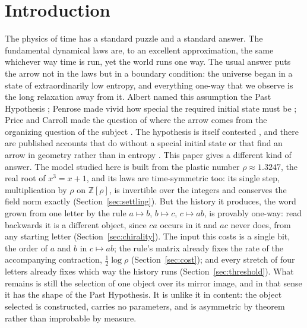 \documentclass[11pt]{amsart}
\theoremstyle{plain}
\theoremstyle{definition}
\theoremstyle{remark}
\begin{document}
\begin{abstract}
diffraction of the mechanical word; the underlying pure-point theorem is cited, not formalized.  We identify this arithmetic with time: the history is one completed object, and its direction is its handedness; the identification is stated at its tier, with each component at its own.
\end{abstract}
\maketitle

\section{Introduction}\label{sec:intro}

The physics of time has a standard puzzle and a standard answer. The fundamental dynamical laws are, to an excellent approximation, the same whichever way time is run, yet the world runs one way. The usual answer puts the arrow not in the laws but in a boundary condition: the universe began in a state of extraordinarily low entropy, and everything one-way that we observe is the long relaxation away from it. Albert named this assumption the Past Hypothesis \cite{albert2000}; Penrose made vivid how special the required initial state must be \cite{penrose1979}; Price and Carroll made the question of where the arrow comes from the organizing question of the subject \cite{price1996,carroll2010}. The hypothesis is itself contested \cite{earman2006}, and there are published accounts that do without a special initial state \cite{carrollchen2004,barbour2014} or that find an arrow in geometry rather than in entropy \cite{castagnino2003}. This paper gives a different kind of answer. The model studied here is built from the plastic number $\rho \approx 1.3247$, the real root of $x^3 = x + 1$, and its laws are time-symmetric too: its single step, multiplication by $\rho$ on $\mathbb{Z}[\rho]$, is invertible over the integers and conserves the field norm exactly (Section~\ref{sec:settling}). But the history it produces, the word grown from one letter by the rule $a \mapsto b$, $b \mapsto c$, $c \mapsto ab$, is provably one-way: read backwards it is a different object, since $ca$ occurs in it and $ac$ never does, from any starting letter (Section~\ref{sec:chirality}). The input this costs is a single bit, the order of $a$ and $b$ in $c \mapsto ab$; the rule's matrix already fixes the rate of the accompanying contraction, $\tfrac12 \log \rho$ (Section~\ref{sec:cost}); and every stretch of four letters already fixes which way the history runs (Section~\ref{sec:threshold}). What remains is still the selection of one object over its mirror image, and in that sense it has the shape of the Past Hypothesis. It is unlike it in content: the object selected is constructed, carries no parameters, and is asymmetric by theorem rather than improbable by measure.
\end{document}

